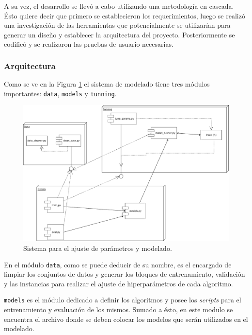         \par A su vez, el desarrollo se llevó a cabo utilizando una metodología
          en cascada. Ésto quiere decir que primero se establecieron los
          requerimientos, luego se realizó una investigación de las
          herramientas que potencialmente se utilizarían para generar
          un diseño y establecer la arquitectura del proyecto. Posteriormente se codificó y se
          realizaron las pruebas de usuario necesarias.

      \subsubsection{Arquitectura}


        \par Como se ve en la Figura \ref{fig:sistema_modelado} el sistema de
          modelado tiene tres módulos importantes: \verb|data|, \verb|models| y
          \verb|tunning|.

          \begin{figure}[hbt]
          \centering%
          \includegraphics[width=1\textwidth]{images/sistema_modeling_mosquitos}%
          \caption{Sistema para el ajuste de parámetros y modelado.}\label{fig:sistema_modelado}
          \end{figure}

        \par En el módulo \verb|data|, como se puede deducir de su nombre,
          es el encargado de limpiar los conjuntos de datos y generar los
          bloques de entrenamiento, validación y las instancias para realizar
          el ajuste de hiperparámetros de cada algoritmo.

        \par \verb|models| es el módulo dedicado a definir los algoritmos y
          posee los \textit{scripts} para el entrenamiento y
          evaluación de los mismos. Sumado a ésto, en este modulo se encuentra
          el archivo donde se deben colocar los modelos que serán utilizados
          en el modelado.

